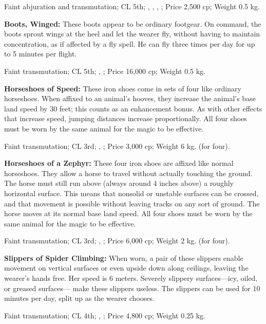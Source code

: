 Faint abjuration and transmutation; CL 5th; , , , ; Price 2,500 cp; Weight 0.5 kg.

\textbf{Boots, Winged:} These boots appear to be ordinary footgear. On command, the boots sprout wings at the heel and let the wearer fly, without having to maintain concentration, as if affected by a fly spell. He can fly three times per day for up to 5 minutes per flight.

Faint transmutation; CL 5th; , ; Price 16,000 cp; Weight 0.5 kg.

\textbf{Horseshoes of Speed:} These iron shoes come in sets of four like ordinary horseshoes. When affixed to an animal's hooves, they increase the animal's base land speed by 30 feet; this counts as an enhancement bonus. As with other effects that increase speed, jumping distances increase proportionally. All four shoes must be worn by the same animal for the magic to be effective.

Faint transmutation; CL 3rd; , ; Price 3,000 cp; Weight 6 kg. (for four).

\textbf{Horseshoes of a Zephyr:} These four iron shoes are affixed like normal horseshoes. They allow a horse to travel without actually touching the ground. The horse must still run above (always around 4 inches above) a roughly horizontal surface. This means that nonsolid or unstable surfaces can be crossed, and that movement is possible without leaving tracks on any sort of ground. The horse moves at its normal base land speed. All four shoes must be worn by the same animal for the magic to be effective.

Faint transmutation; CL 3rd; , ; Price 6,000 cp; Weight 2 kg. (for four).

\textbf{Slippers of Spider Climbing:} When worn, a pair of these slippers enable movement on vertical surfaces or even upside down along ceilings, leaving the wearer's hands free. Her speed is 6 meters. Severely slippery surfaces---icy, oiled, or greased surfaces--- make these slippers useless. The slippers can be used for 10 minutes per day, split up as the wearer chooses.

Faint transmutation; CL 4th; , ; Price 4,800 cp; Weight 0.25 kg.
